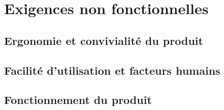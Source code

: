 \documentclass[a4paper, 12pt, french]{report}
\begin{document}
	\chapter{Exigences non fonctionnelles}
		\section{Ergonomie et convivialité du produit}
			

		\section{Facilité d'utilisation et facteurs humains}
			

		\section{Fonctionnement du produit}
			
		
\end{document}

